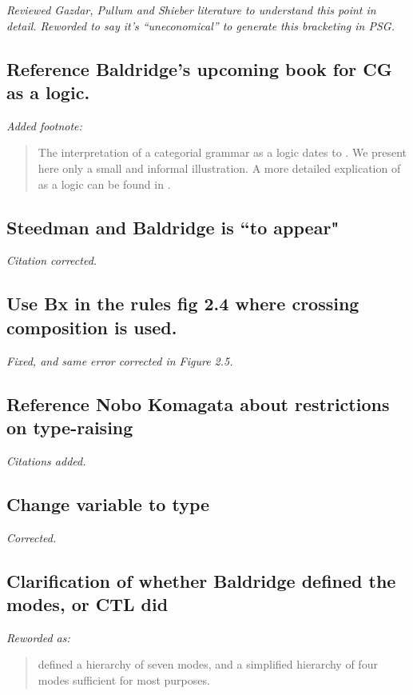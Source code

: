 \emph{Reviewed Gazdar, Pullum and Shieber literature to understand this
point in detail. Reworded to say it's ``uneconomical'' to generate this
bracketing in PSG.}

\subsection{Reference Baldridge's upcoming book for CG as a logic.}

\emph{Added footnote:}
\begin{quote}
The interpretation of a categorial grammar as a logic
dates to \citet{lambek:58}. We present here only a small and informal
illustration.
A more detailed explication of \cg as a logic can be found in
\citet{steedman:pedia}. 
\end{quote}


\subsection{Steedman and Baldridge is ``to appear"}

\emph{Citation corrected.}

\subsection{Use Bx in the rules fig 2.4 where crossing composition is used.}

\emph{Fixed, and same error corrected in Figure 2.5.}

\subsection{Reference Nobo Komagata about restrictions on type-raising}

\emph{Citations added.}

\subsection{Change variable to type}

\emph{Corrected.}

\subsection{Clarification of whether Baldridge defined the modes, or CTL did}

\emph{Reworded as:}
\begin{quote}
\citet{baldridge:thesis02} defined a hierarchy of seven modes, and a simplified
hierarchy of four modes sufficient for most purposes. 
\end{quote}


